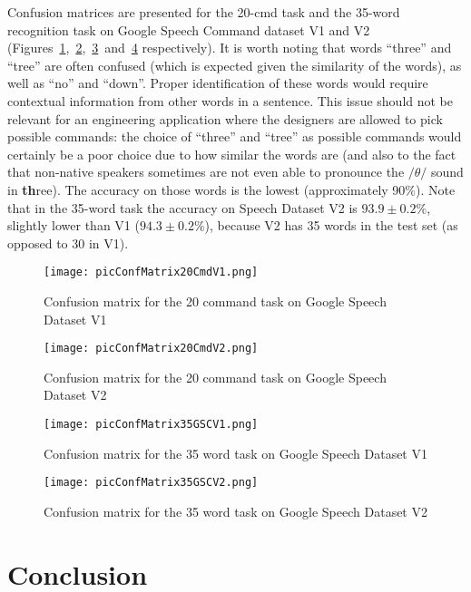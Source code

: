 \documentclass[authoryear, review, 12pt, 3p]{elsarticle}
\begin{document}
Confusion matrices are presented for the 20-cmd task and the 35-word recognition task on Google Speech Command dataset V1 and V2 (Figures~\ref{figConfMatrix20cmdV1},~\ref{figConfMatrix20cmdV2},~\ref{figConfMatrix35V1}~and~\ref{figConfMatrix35V2} respectively). It is worth noting that words ``three'' and ``tree'' are often confused (which is expected given the similarity of the words), as well as ``no'' and ``down''. Proper identification of these words would require contextual information from other words in a sentence. This issue should not be relevant for an engineering application where the designers are allowed to pick possible commands: the choice of ``three'' and ``tree'' as possible commands would certainly be a poor choice due to how similar the words are (and also to the fact that non-native speakers sometimes are not even able to pronounce the $/\theta/$ sound in \textbf{th}ree). The accuracy on those words is the lowest (approximately 90\%). Note that in the 35-word task the accuracy on Speech Dataset V2 is $93.9\pm0.2\%$, slightly lower than V1 ($94.3\pm0.2\%$), because V2 has 35 words in the test set (as opposed to 30 in V1).

\begin{figure}[!ht]
\centering
\texttt{[image: picConfMatrix20CmdV1.png]}
\caption{Confusion matrix for the 20 command task on Google Speech Dataset V1}
\label{figConfMatrix20cmdV1}
\end{figure}

\begin{figure}[!ht]
\centering
\texttt{[image: picConfMatrix20CmdV2.png]}
\caption{Confusion matrix for the 20 command task on Google Speech Dataset V2}
\label{figConfMatrix20cmdV2}
\end{figure}

\begin{figure}[!ht]
\centering
\texttt{[image: picConfMatrix35GSCV1.png]}
\caption{Confusion matrix for the 35 word task on Google Speech Dataset V1}
\label{figConfMatrix35V1}
\end{figure}

\begin{figure}[!ht]
\centering
\texttt{[image: picConfMatrix35GSCV2.png]}
\caption{Confusion matrix for the 35 word task on Google Speech Dataset V2}
\label{figConfMatrix35V2}
\end{figure}


\clearpage

\section{Conclusion}
\label{secConclusion}
\end{document}
